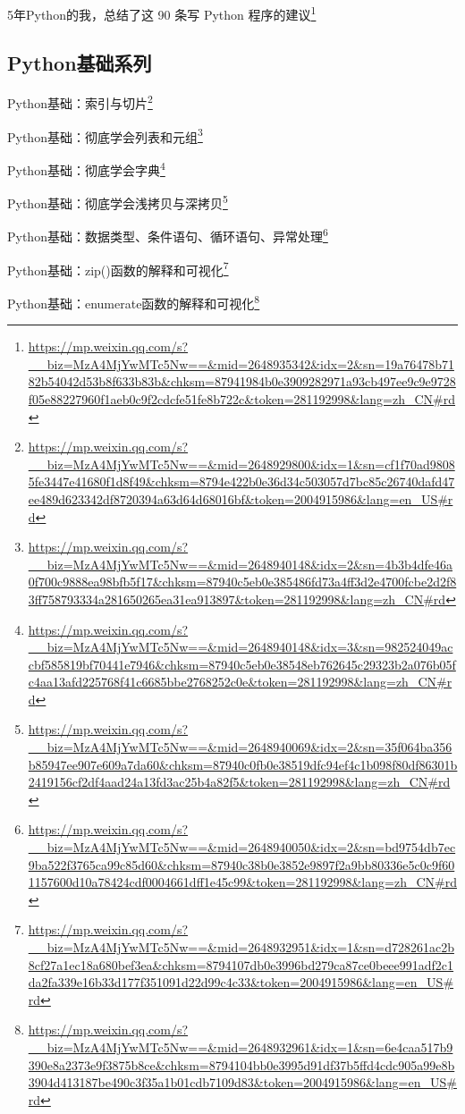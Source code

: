 \documentclass[]{ctexbook}
\renewcommand{\href}[2]{#2\footnote{\url{#1}}}
\begin{document}
\href{https://mp.weixin.qq.com/s?__biz=MzA4MjYwMTc5Nw==\&mid=2648935342\&idx=2\&sn=19a76478b7182b54042d53b8f633b83b\&chksm=87941984b0e3909282971a93cb497ee9c9e9728f05e88227960f1aeb0c9f2cdcfe51fe8b722c\&token=281192998\&lang=zh_CN\#rd}{5年Python的我，总结了这 90 条写 Python 程序的建议}

\hypertarget{pythonux57faux7840ux7cfbux5217}{%
\subsection{Python基础系列}\label{pythonux57faux7840ux7cfbux5217}}

\href{https://mp.weixin.qq.com/s?__biz=MzA4MjYwMTc5Nw==\&mid=2648929800\&idx=1\&sn=cf1f70ad98085fe3447e41680f1d8f49\&chksm=8794e422b0e36d34c503057d7bc85c26740dafd47ee489d623342df8720394a63d64d68016bf\&token=2004915986\&lang=en_US\#rd}{Python基础：索引与切片}

\href{https://mp.weixin.qq.com/s?__biz=MzA4MjYwMTc5Nw==\&mid=2648940148\&idx=2\&sn=4b3b4dfe46a0f700c9888ea98bfb5f17\&chksm=87940c5eb0e385486fd73a4ff3d2e4700fcbe2d2f83ff758793334a281650265ea31ea913897\&token=281192998\&lang=zh_CN\#rd}{Python基础：彻底学会列表和元组}

\href{https://mp.weixin.qq.com/s?__biz=MzA4MjYwMTc5Nw==\&mid=2648940148\&idx=3\&sn=982524049accbf585819bf70441e7946\&chksm=87940c5eb0e38548eb762645c29323b2a076b05fc4aa13afd225768f41c6685bbe2768252c0e\&token=281192998\&lang=zh_CN\#rd}{Python基础：彻底学会字典}

\href{https://mp.weixin.qq.com/s?__biz=MzA4MjYwMTc5Nw==\&mid=2648940069\&idx=2\&sn=35f064ba356b85947ee907e609a7da60\&chksm=87940c0fb0e38519dfc94ef4c1b098f80df86301b2419156cf2df4aad24a13fd3ac25b4a82f5\&token=281192998\&lang=zh_CN\#rd}{Python基础：彻底学会浅拷贝与深拷贝}

\href{https://mp.weixin.qq.com/s?__biz=MzA4MjYwMTc5Nw==\&mid=2648940050\&idx=2\&sn=bd9754db7ec9ba522f3765ca99c85d60\&chksm=87940c38b0e3852e9897f2a9bb80336e5c0c9f601157600d10a78424cdf0004661dff1e45c99\&token=281192998\&lang=zh_CN\#rd}{Python基础：数据类型、条件语句、循环语句、异常处理}

\href{https://mp.weixin.qq.com/s?__biz=MzA4MjYwMTc5Nw==\&mid=2648932951\&idx=1\&sn=d728261ac2b8cf27a1ec18a680bef3ea\&chksm=8794107db0e3996bd279ca87ce0beee991adf2c1da2fa339e16b33d177f351091d22d99c4c33\&token=2004915986\&lang=en_US\#rd}{Python基础：zip()函数的解释和可视化}

\href{https://mp.weixin.qq.com/s?__biz=MzA4MjYwMTc5Nw==\&mid=2648932961\&idx=1\&sn=6e4caa517b9390e8a2373e9f3875b8ce\&chksm=8794104bb0e3995d91df37b5ffd4cdc905a99e8b3904d413187be490c3f35a1b01cdb7109d83\&token=2004915986\&lang=en_US\#rd}{Python基础：enumerate函数的解释和可视化}
\end{document}
